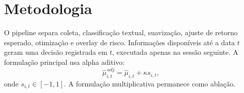 \section{Metodologia}
O pipeline separa coleta, classificação textual, suavização, ajuste de retorno
esperado, otimização e overlay de risco. Informações disponíveis até a data
$t$ geram uma decisão registrada em $t$, executada apenas na sessão seguinte.
A formulação principal usa alpha aditivo:
\[
\hat{\mu}_{i,t}^{\,adj}=\hat{\mu}_{i,t}+\kappa s_{i,t},
\]
onde $s_{i,t}\in[-1,1]$. A formulação multiplicativa permanece como ablação.
